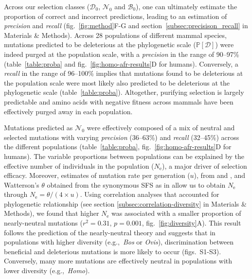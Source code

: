 \documentclass{article}
\newcommand{\Ne}{N_{\text{e}}}
\newcommand{\proba}{\mathbb{P}}
\newcommand{\SphyDel}{\mathcal{D}_0}
\newcommand{\SphyNeu}{\mathcal{N}_0}
\newcommand{\SphyBen}{\mathcal{B}_0}
\newcommand{\SpopDel}{\mathcal{D}}
\newcommand{\ProbaPopDel}{\proba [ \SpopDel]}
\begin{document}
    Across our selection classes ($\SphyDel$, $\SphyNeu$ and $\SphyBen$), one can ultimately estimate the proportion of correct and incorrect predictions, leading to an estimation of \textit{precision} and \textit{recall} (fig.~\ref{fig:method}F-G and section~\ref{subsec:precisison_recall} in Materials \& Methods).
    Across 28 populations of different mammal species, mutations predicted to be deleterious at the phylogenetic scale ($\ProbaPopDel$) were indeed purged at the population scale, with a \textit{precision} in the range of 90--97\% (table~\ref{table:proba} and fig.~\ref{fig:homo-afr-results}D for humans).
    Conversely, a \textit{recall} in the range of 96--100\% implies that mutations found to be deleterious at the population scale were most likely also predicted to be deleterious at the phylogenetic scale (table~\ref{table:proba}).
    Altogether, purifying selection is largely predictable and amino acids with negative fitness across mammals have been effectively purged away in each population.

    Mutations predicted as $\SphyNeu$ were effectively composed of a mix of neutral and selected mutations with varying \textit{precision} (36--63\%) and \textit{recall} (32--45\%) across the different populations (table~\ref{table:proba}, fig.~\ref{fig:homo-afr-results}D for humans).
    The variable proportions between populations can be explained by the effective number of individuals in the population ($\Ne$), a major driver of selection efficacy.
    Moreover, estimates of mutation rate per generation ($u$), from \textcite{bergeron_evolution_2023} and \textcite{orlando_recalibrating_2013}, and Watterson’s $\theta$ obtained from the synonymous SFS as in \textcite{achaz_frequency_2009} allow us to obtain $\Ne$ through $\Ne=\theta/(4 \times u)$.
    Using correlation analyses that accounted for phylogenetic relationship (see section \ref{subsec:correlation-diversity} in Materials \& Methods), we found that higher $\Ne$ was associated with a smaller proportion of nearly-neutral mutations ($r^2=0.31$, $p=0.001$, fig.~\ref{fig:diversity}A).
    This result follows the prediction of the nearly-neutral theory and suggests that in populations with higher diversity (e.g.,~\textit{Bos} or \textit{Ovis}), discrimination between beneficial and deleterious mutations is more likely to occur (figs.~S1-S3).
    Conversely, many more mutations are effectively neutral in populations with lower diversity (e.g.,~\textit{Homo}).
\end{document}
